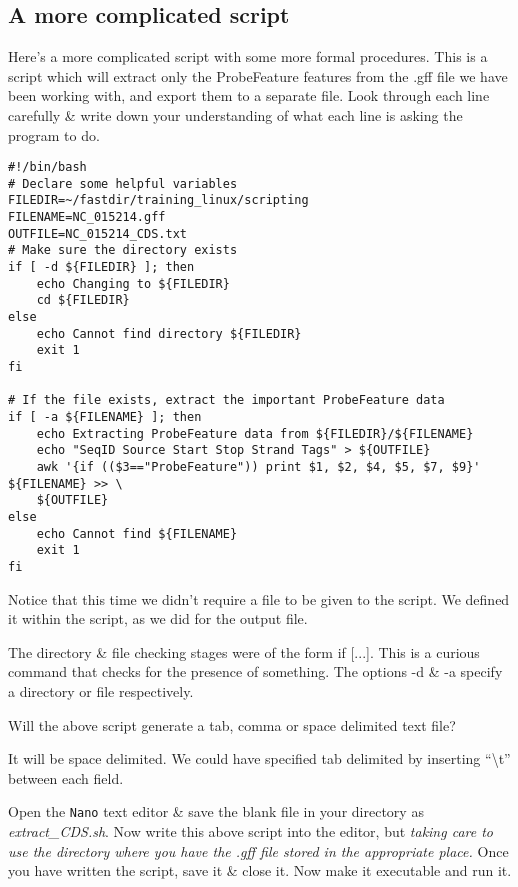 \subsection*{A more complicated script}

Here's a more complicated script with some more formal procedures.
This is a script which will extract only the ProbeFeature features from the .gff file we have been working
with, and export them to a separate file.
Look through each line carefully \& write down your understanding of what each line is asking the
program to do.

\begin{lstlisting}[style=command_syntax]
#!/bin/bash
# Declare some helpful variables
FILEDIR=~/fastdir/training_linux/scripting
FILENAME=NC_015214.gff
OUTFILE=NC_015214_CDS.txt
# Make sure the directory exists
if [ -d ${FILEDIR} ]; then
	echo Changing to ${FILEDIR}
	cd ${FILEDIR}
else
	echo Cannot find directory ${FILEDIR}
	exit 1
fi

# If the file exists, extract the important ProbeFeature data
if [ -a ${FILENAME} ]; then
	echo Extracting ProbeFeature data from ${FILEDIR}/${FILENAME}
	echo "SeqID Source Start Stop Strand Tags" > ${OUTFILE}
	awk '{if (($3=="ProbeFeature")) print $1, $2, $4, $5, $7, $9}' ${FILENAME} >> \
	${OUTFILE}
else
	echo Cannot find ${FILENAME}
	exit 1
fi

\end{lstlisting}

Notice that this time we didn't require a file to be given to the script.
We defined it within the script, as we did for the output file.

\begin{information}
The directory \& file checking stages were of the form if [...].
This is a curious command that checks for the presence of something. 
The options -d \& -a specify a directory or file respectively.
\end{information}

\begin{questions}
Will the above script generate a tab, comma or space delimited text file? \\
\begin{answer}
It will be space delimited. 
We could have specified tab delimited by inserting ``\textbackslash t'' between each field.
\end{answer}
\end{questions}

\begin{steps}
Open the \texttt{Nano} text editor \& save the blank file in your directory as
\textit{extract\_CDS.sh}.
Now write this above script into the editor, but \textit{taking care to use the directory where you
have the .gff file stored in the appropriate place.}
Once you have written the script, save it \& close it.
Now make it executable and run it.\\
\end{steps}


